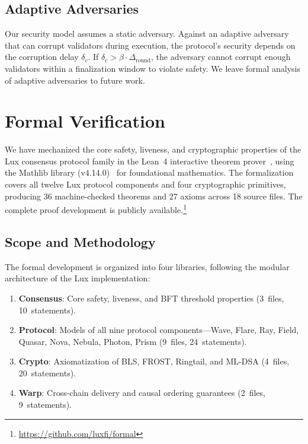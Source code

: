 \documentclass[11pt,a4paper]{article}
\begin{document}
\subsection{Adaptive Adversaries}

Our security model assumes a static adversary. Against an adaptive adversary that can corrupt
validators during execution, the protocol's security depends on the corruption delay $\delta_c$.
If $\delta_c > \beta \cdot \Delta_{\text{round}}$, the adversary cannot corrupt enough
validators within a finalization window to violate safety. We leave formal analysis of
adaptive adversaries to future work.

\section{Formal Verification}
\label{sec:formal}

We have mechanized the core safety, liveness, and cryptographic properties of the Lux
consensus protocol family in the Lean~4 interactive theorem prover~\cite{moura2021lean4},
using the Mathlib library (v4.14.0)~\cite{mathlib4} for foundational mathematics. The
formalization covers all twelve Lux protocol components and four cryptographic primitives,
producing 36 machine-checked theorems and 27 axioms across 18 source files.
The complete proof development is publicly available.\footnote{\url{https://github.com/luxfi/formal}}

\subsection{Scope and Methodology}

The formal development is organized into four libraries, following the modular
architecture of the Lux implementation:

\begin{enumerate}
\item \textbf{Consensus}: Core safety, liveness, and BFT threshold properties
(3~files, 10~statements).
\item \textbf{Protocol}: Models of all nine protocol components---Wave, Flare,
Ray, Field, Quasar, Nova, Nebula, Photon, Prism (9~files, 24~statements).
\item \textbf{Crypto}: Axiomatization of BLS, FROST, Ringtail, and ML-DSA
(4~files, 20~statements).
\item \textbf{Warp}: Cross-chain delivery and causal ordering guarantees
(2~files, 9~statements).
\end{enumerate}
\end{document}
